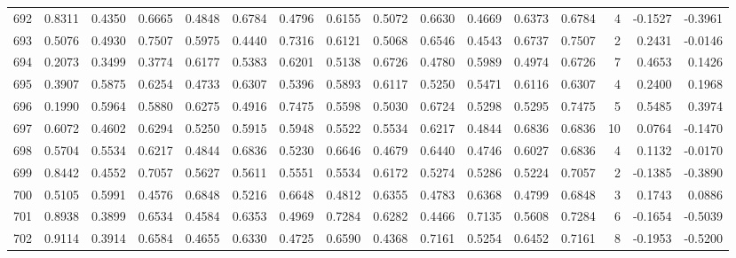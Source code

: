 \begin{tabular}{lrrrrrrrrrrrrrrr}
692 &      0.8311 &  0.4350 &  0.6665 &  0.4848 &  0.6784 &  0.4796 &  0.6155 &  0.5072 &  0.6630 &  0.4669 &   0.6373 &     0.6784 &      4 &                   -0.1527 &                    -0.3961 \\
693 &      0.5076 &  0.4930 &  0.7507 &  0.5975 &  0.4440 &  0.7316 &  0.6121 &  0.5068 &  0.6546 &  0.4543 &   0.6737 &     0.7507 &      2 &                    0.2431 &                    -0.0146 \\
694 &      0.2073 &  0.3499 &  0.3774 &  0.6177 &  0.5383 &  0.6201 &  0.5138 &  0.6726 &  0.4780 &  0.5989 &   0.4974 &     0.6726 &      7 &                    0.4653 &                     0.1426 \\
695 &      0.3907 &  0.5875 &  0.6254 &  0.4733 &  0.6307 &  0.5396 &  0.5893 &  0.6117 &  0.5250 &  0.5471 &   0.6116 &     0.6307 &      4 &                    0.2400 &                     0.1968 \\
696 &      0.1990 &  0.5964 &  0.5880 &  0.6275 &  0.4916 &  0.7475 &  0.5598 &  0.5030 &  0.6724 &  0.5298 &   0.5295 &     0.7475 &      5 &                    0.5485 &                     0.3974 \\
697 &      0.6072 &  0.4602 &  0.6294 &  0.5250 &  0.5915 &  0.5948 &  0.5522 &  0.5534 &  0.6217 &  0.4844 &   0.6836 &     0.6836 &     10 &                    0.0764 &                    -0.1470 \\
698 &      0.5704 &  0.5534 &  0.6217 &  0.4844 &  0.6836 &  0.5230 &  0.6646 &  0.4679 &  0.6440 &  0.4746 &   0.6027 &     0.6836 &      4 &                    0.1132 &                    -0.0170 \\
699 &      0.8442 &  0.4552 &  0.7057 &  0.5627 &  0.5611 &  0.5551 &  0.5534 &  0.6172 &  0.5274 &  0.5286 &   0.5224 &     0.7057 &      2 &                   -0.1385 &                    -0.3890 \\
700 &      0.5105 &  0.5991 &  0.4576 &  0.6848 &  0.5216 &  0.6648 &  0.4812 &  0.6355 &  0.4783 &  0.6368 &   0.4799 &     0.6848 &      3 &                    0.1743 &                     0.0886 \\
701 &      0.8938 &  0.3899 &  0.6534 &  0.4584 &  0.6353 &  0.4969 &  0.7284 &  0.6282 &  0.4466 &  0.7135 &   0.5608 &     0.7284 &      6 &                   -0.1654 &                    -0.5039 \\
702 &      0.9114 &  0.3914 &  0.6584 &  0.4655 &  0.6330 &  0.4725 &  0.6590 &  0.4368 &  0.7161 &  0.5254 &   0.6452 &     0.7161 &      8 &                   -0.1953 &                    -0.5200 \\

\end{tabular}
